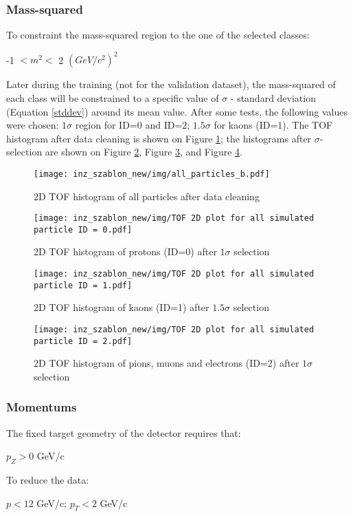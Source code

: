 \subsubsection{Mass-squared}
To constraint the mass-squared region to the one of the selected classes:
\begin{center}
    -1 $ < m^2 < $ 2 $(GeV/c^2)^2$
\end{center}
Later during the training (not for the validation dataset), the mass-squared of each class will be constrained to a specific value of $\sigma$ - standard deviation (Equation \ref{stddev}) around its mean value. After some tests, the following values were chosen: $1 \sigma$ region for ID=0 and ID=2; $1.5 \sigma$ for kaons (ID=1). The TOF histogram after data cleaning is shown on Figure \ref{tof clean}; the histograms after $\sigma$-selection are shown on Figure \ref{tof id0}, Figure \ref{tof id1}, and Figure \ref{tof id2}.
\begin{figure}[H]
    \centering
    \texttt{[image: inz\_szablon\_new/img/all\_particles\_b.pdf]}
    \caption{2D TOF histogram of all particles after data cleaning}
    \label{tof clean}
\end{figure}
\begin{figure}[H]
    \centering
    \texttt{[image: inz\_szablon\_new/img/TOF 2D plot for all simulated particle ID = 0.pdf]}
    \caption{2D TOF histogram of protons (ID=0) after $1 \sigma$ selection}
    \label{tof id0}
\end{figure}
\begin{figure}[H]
    \centering
    \texttt{[image: inz\_szablon\_new/img/TOF 2D plot for all simulated particle ID = 1.pdf]}
    \caption{2D TOF histogram of kaons (ID=1) after $1.5 \sigma$ selection}
     \label{tof id1}
\end{figure}
\begin{figure}[H]
    \centering
    \texttt{[image: inz\_szablon\_new/img/TOF 2D plot for all simulated particle ID = 2.pdf]}
    \caption{2D TOF histogram of pions, muons and electrons (ID=2) after $1 \sigma$ selection}
     \label{tof id2}
\end{figure}
\subsubsection{Momentums}
The fixed target geometry of the detector requires that:
\begin{center}
    $p_Z > 0 $ GeV/c
\end{center}
To reduce the data:
\begin{center}
    $p < 12$ GeV/c; $p_T < 2$ GeV/c
\end{center}
